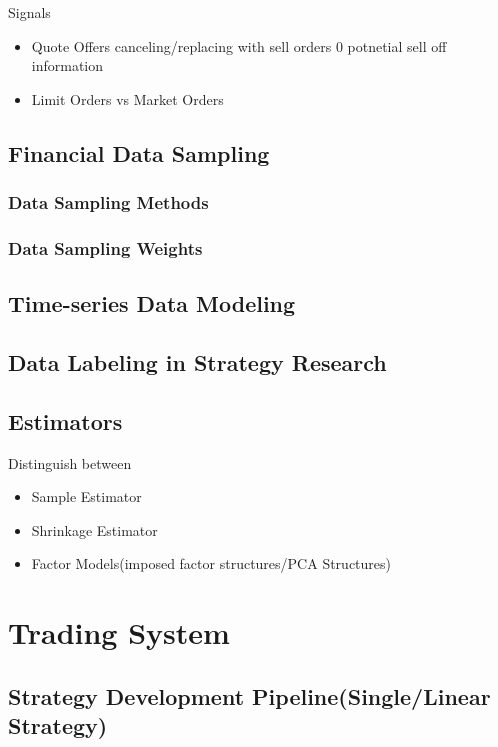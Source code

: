 \documentclass[11pt, openany]{book}              %
\begin{document}
Signals

\begin{itemize}
 \item Quote Offers canceling/replacing with sell orders 0 potnetial sell off information
 \item Limit Orders vs Market Orders 
\end{itemize}

\section{Financial Data Sampling}

\subsection{Data Sampling Methods}

\subsection{Data Sampling Weights}

\section{Time-series Data Modeling}

\section{Data Labeling in Strategy Research}

\section{Estimators}

Distinguish between
\begin{itemize}
	\item Sample Estimator
	\item Shrinkage Estimator
	\item Factor Models(imposed factor structures/PCA Structures)
\end{itemize}


\chapter{ Trading System }



\section{ Strategy Development Pipeline(Single/Linear Strategy) }
\end{document}
